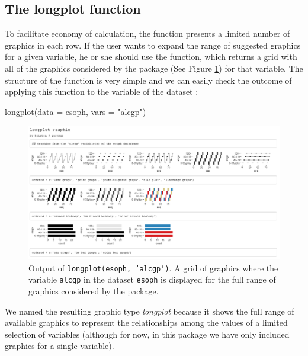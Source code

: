 \hypertarget{the-longplot-function}{%
	\subsection{The longplot function}\label{the-longplot-function}}

To facilitate economy of calculation, the  function
presents a limited number of graphics in each row. If the user wants to
expand the range of suggested graphics for a given variable, he or she
should use the  function, which returns a grid with all
of the graphics considered by the package (See Figure
\ref{fig:longplotesophagegp}) for that variable. The structure of the
function is very simple  and we
can easily check the outcome of applying this function to the variable
 of the dataset :


\begin{example}
  longplot(data = esoph, vars = "alcgp")
\end{example}

\vspace{-5pt}

\begin{Schunk}
	\begin{figure}[H]
\includegraphics[width=0.95\linewidth]{figures/longplot_esoph_alcgp} \caption[Output of 'longplot(esoph, 'alcgp')']{Output of \texttt{longplot(esoph, 'alcgp')}. A grid of graphics where the variable \texttt{alcgp} in the dataset \texttt{esoph} is displayed for the full range of graphics considered by the package.}\label{fig:longplotesophagegp}
	\end{figure}
\end{Schunk}

We named the resulting graphic type \emph{longplot} because it shows the
full range of available graphics to represent the relationships among
the values of a limited selection of variables (although for now, in
this package we have only included graphics for a single variable).

